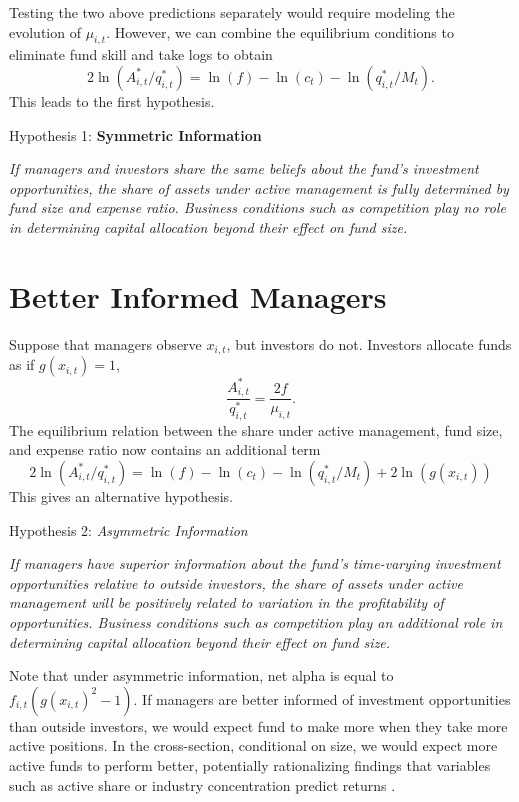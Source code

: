 \documentclass[]{book}
\theoremstyle{definition}
\theoremstyle{definition}
\theoremstyle{definition}
\theoremstyle{remark}
\begin{document}
Testing the two above predictions separately would require modeling the
evolution of \(\mu_{i,t}\). However, we can combine the equilibrium
conditions to eliminate fund skill and take logs to obtain
\begin{equation}
2\ln(A_{i,t}^\ast/q^\ast_{i,t})=\ln(f) - \ln(c_t) - \ln(q^\ast_{i,t}/M_t).
\label{eq:csEq}
\end{equation} This leads to the first hypothesis.

Hypothesis 1: \textbf{Symmetric Information}

\emph{If managers and investors share the same beliefs about the fund's
investment opportunities, the share of assets under active management is
fully determined by fund size and expense ratio. Business conditions
such as competition play no role in determining capital allocation
beyond their effect on fund size.}

\hypertarget{better-informed-managers}{%
\section{Better Informed Managers}\label{better-informed-managers}}

Suppose that managers observe \(x_{i,t}\), but investors do not.
Investors allocate funds as if \(g(x_{i,t})=1\), \begin{equation}
\frac{A_{i,t}^\ast}{q_{i,t}^\ast}=\frac{2f}{\mu_{i,t}}.
\end{equation} The equilibrium relation between the share under active
management, fund size, and expense ratio now contains an additional term
\begin{equation}
2\ln(A_{i,t}^\ast/q^\ast_{i,t})=\ln(f) - \ln(c_t) - \ln(q^\ast_{i,t}/M_t) + 2\ln(g(x_{i,t}))
\label{eq:csEQa}
\end{equation} This gives an alternative hypothesis.

Hypothesis 2: \emph{Asymmetric Information}

\emph{If managers have superior information about the fund's
time-varying investment opportunities relative to outside investors, the
share of assets under active management will be positively related to
variation in the profitability of opportunities. Business conditions
such as competition play an additional role in determining capital
allocation beyond their effect on fund size.}

Note that under asymmetric information, net alpha is equal to
\(f_{i,t}(g(x_{i,t})^2-1)\). If managers are better informed of
investment opportunities than outside investors, we would expect fund to
make more when they take more active positions. In the cross-section,
conditional on size, we would expect more active funds to perform
better, potentially rationalizing findings that variables such as active
share or industry concentration predict returns \citep{cp09, ksz05}.
\end{document}
